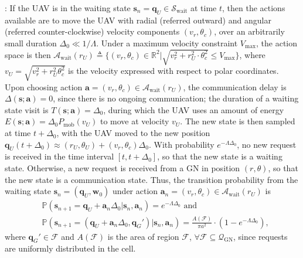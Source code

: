 \documentclass[10pt,twocolumn]{IEEEtran}
\begin{document}
: If the UAV is in the waiting state $\mathbf{s}_{n} = \mathbf{q}_{U} \in \mathcal{S}_{\mathrm{wait}}$ at time $t$, then the actions available are to move the UAV with radial (referred outward) and angular (referred counter-clockwise) velocity components $(v_{r},\theta_{c})$, over an arbitrarily small duration $\Delta_{0}{\ll}1/\Lambda$. Under a maximum velocity constraint $V_{\mathrm{max}}$, the action space is then $\mathcal{A}_{\mathrm{wait}}(r_{U}){\triangleq}\Big\{(v_{r},\theta_{c}){\in}\mathbb{R}^{2}\Big|\sqrt{v_{r}^{2}{+}r_{U}^{2}{\cdot}\theta_{c}^{2}}{\leq}V_{\mathrm{max}}\Big\}$, where $v_{U}{=}\sqrt{v_{r}^{2}{+}r_{U}^{2}\theta_{c}^{2}}$ is the velocity expressed with respect to polar coordinates. Upon choosing action $\mathbf{a}{=}(v_{r},\theta_{c}){\in}\mathcal{A}_{\mathrm{wait}}(r_{U})$, the communication delay is $\Delta(\mathbf{s};\mathbf{a}){=}0$, since there is no ongoing communication; the duration of a waiting state visit is $T(\mathbf{s};\mathbf{a}){=}\Delta_{0}$, during which the UAV uses an amount of energy $E(\mathbf{s};\mathbf{a}){=}\Delta_{0}P_{\mathrm{mob}} \left(v_{U}\right)$ to move at velocity $v_{U}$. The new state is then sampled at time $t{+}\Delta_{0}$, with the UAV moved to the new position $\mathbf{q}_{U}(t{+}\Delta_{0}){\approx}(r_{U},\theta_{U}){+}(v_{r},\theta_{c})\Delta_{0}$. With probability $e^{-\Lambda \Delta_{0}}$, no new request is received in the time interval $[t,t{+}\Delta_{0}]$, so that the new state is a waiting state.  Otherwise, a new request is received from a GN in position $(r,\theta)$, so that the new state is a communication state. Thus, the transition probability from the waiting state $\mathbf{s}_{n}{=}(\mathbf{q}_{U},\mathbf{w}_{0})$ under action $\mathbf{a}_{n}{=}(v_{r},\theta_{c}){\in}\mathcal{A}_{\mathrm{wait}}(r_{U})$ is 
\begin{align}\label{eq:R0ContTrProb}
    &\mathbb{P}(\mathbf{s}_{n+1}{=}\mathbf{q}_{U}{+}\mathbf a_{n}\Delta_{0}{|}\mathbf{s}_{n},\mathbf{a}_{n}){=}e^{-\Lambda \Delta_{0}}\text{ and }\\
    &\mathbb{P}(\mathbf{s}_{n{+}1}{=}(\mathbf{q}_{U}{+}\mathbf{a}_{n}\Delta_{0},\mathbf{q}_{G}')|\mathbf{s}_{n},\mathbf{a}_{n}){=}\frac{A(\mathcal{F})}{\pi a^{2}}{\cdot}(1{-}e^{-\Lambda\Delta_{0}}),\nonumber
\end{align}
where $\mathbf{q}_{G}'{\in}\mathcal{F}$ and $A(\mathcal{F})$ is the area of region $\mathcal{F}$, ${\forall}\mathcal{F}{\subseteq}\mathcal{Q}_{\mathrm{GN}}$, since requests are uniformly distributed in the cell.\\
\end{document}
